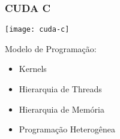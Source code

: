 \documentclass[10pt, compress]{beamer}
\begin{document}
%
%
%

\begin{frame}
    \frametitle{CUDA C}
    \begin{center}
        \texttt{[image: cuda-c]}
    \end{center}
    Modelo de Programação:
    \begin{itemize}
        \item \alert{Kernels}
        \item Hierarquia de \alert{Threads}
        \item Hierarquia de \alert{Memória}
        \item Programação \alert{Heterogênea}
    \end{itemize}
\end{frame}
\end{document}
